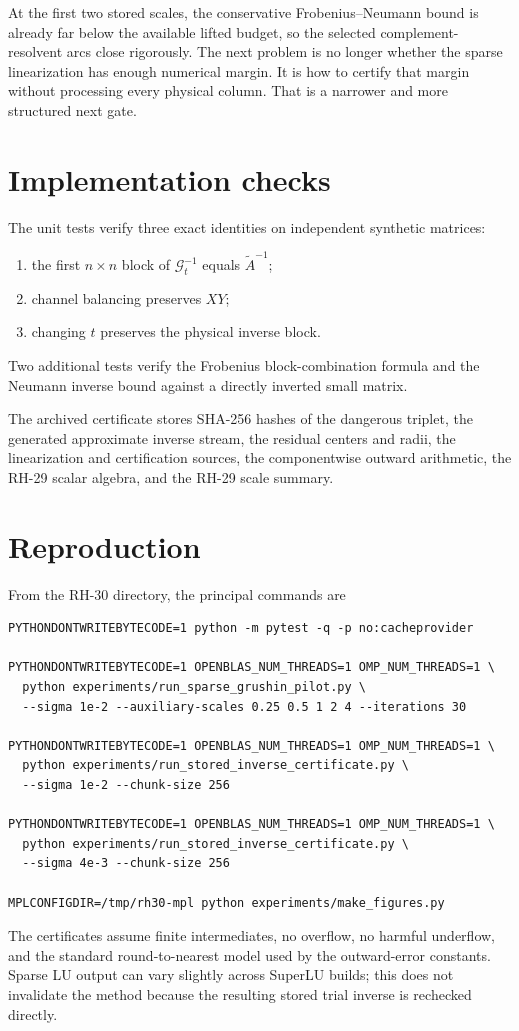 \documentclass[11pt]{article}
\theoremstyle{definition}
\theoremstyle{remark}
\newcommand{\Atilde}{\widetilde A}
\newcommand{\Gmat}{\mathcal G}
\begin{document}
At the first two stored scales, the conservative Frobenius--Neumann bound is
already far below the available lifted budget, so the selected complement-
resolvent arcs close rigorously.  The next problem is no longer whether the
sparse linearization has enough numerical margin.  It is how to certify that
margin without processing every physical column.  That is a narrower and
more structured next gate.


\appendix

\section{Implementation checks}
\label{app:checks}

The unit tests verify three exact identities on independent synthetic
matrices:
\begin{enumerate}
 \item the first $n\times n$ block of $\Gmat_t^{-1}$ equals
       $\Atilde^{-1}$;
 \item channel balancing preserves $XY$;
 \item changing $t$ preserves the physical inverse block.
\end{enumerate}
Two additional tests verify the Frobenius block-combination formula and the
Neumann inverse bound against a directly inverted small matrix.

The archived certificate stores SHA-256 hashes of the dangerous triplet,
the generated approximate inverse stream, the residual centers and radii,
the linearization and certification sources, the componentwise outward
arithmetic, the RH-29 scalar algebra, and the RH-29 scale summary.

\section{Reproduction}
\label{app:reproduction}

From the RH-30 directory, the principal commands are
\begin{verbatim}
PYTHONDONTWRITEBYTECODE=1 python -m pytest -q -p no:cacheprovider

PYTHONDONTWRITEBYTECODE=1 OPENBLAS_NUM_THREADS=1 OMP_NUM_THREADS=1 \
  python experiments/run_sparse_grushin_pilot.py \
  --sigma 1e-2 --auxiliary-scales 0.25 0.5 1 2 4 --iterations 30

PYTHONDONTWRITEBYTECODE=1 OPENBLAS_NUM_THREADS=1 OMP_NUM_THREADS=1 \
  python experiments/run_stored_inverse_certificate.py \
  --sigma 1e-2 --chunk-size 256

PYTHONDONTWRITEBYTECODE=1 OPENBLAS_NUM_THREADS=1 OMP_NUM_THREADS=1 \
  python experiments/run_stored_inverse_certificate.py \
  --sigma 4e-3 --chunk-size 256

MPLCONFIGDIR=/tmp/rh30-mpl python experiments/make_figures.py
\end{verbatim}
The certificates assume finite intermediates, no overflow, no harmful
underflow, and the standard round-to-nearest model used by the outward-error
constants.  Sparse LU output can vary slightly across SuperLU builds; this
does not invalidate the method because the resulting stored trial inverse is
rechecked directly.



\end{document}
